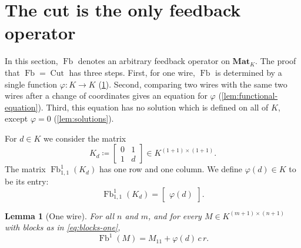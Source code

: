 \documentclass[11pt,a4paper]{article}
\theoremstyle{plain}
\newtheorem{lemma}[theorem]{Lemma}
\theoremstyle{definition}
\theoremstyle{remark}
\DeclareMathOperator{\Fb}{Fb}
\DeclareMathOperator{\Cut}{Cut}
\newcommand{\Mat}{\mathbf{Mat}}
\begin{document}
\section{The cut is the only feedback operator}
\label{sec:unique}

In this section, $\Fb$ denotes an arbitrary feedback operator on $\Mat_K$.
The proof that $\Fb = \Cut$ has three steps.
First, for one wire, $\Fb$ is determined by a single function $\varphi \colon K \to K$ (\cref{lem:one-wire}).
Second, comparing two wires with the same two wires after a change of coordinates gives an equation for $\varphi$ (\cref{lem:functional-equation}).
Third, this equation has no solution which is defined on all of $K$, except $\varphi = 0$ (\cref{lem:solutions}).

For $d \in K$ we consider the matrix
\begin{equation}
    \label{eq:Kd}
    K_d \coloneqq \begin{bmatrix} 0 & 1 \\ 1 & d \end{bmatrix} \in K^{(1+1) \times (1+1)} .
\end{equation}
The matrix $\Fb^1_{1,1}(K_d)$ has one row and one column.
We define $\varphi(d) \in K$ to be its entry:
\begin{equation}
    \label{eq:phi}
    \Fb^1_{1,1}(K_d) = \begin{bmatrix} \varphi(d) \end{bmatrix} .
\end{equation}

\begin{lemma}[One wire]
    \label{lem:one-wire}
    For all $n$ and $m$, and for every $M \in K^{(m+1) \times (n+1)}$ with blocks as in \cref{eq:blocks-one},
    \begin{equation}
        \label{eq:one-wire}
        \Fb^1(M) = M_{11} + \varphi(d)\, c\, r .
    \end{equation}
\end{lemma}
\end{document}
